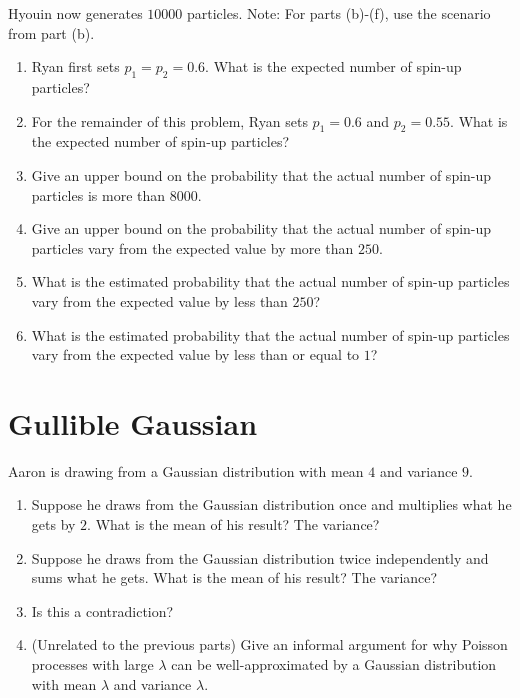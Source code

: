 \documentclass{article}
\begin{document}
Hyouin now generates $10000$ particles. Note: For parts (b)-(f), use the scenario from part (b).

\begin{enumerate}[label=(\alph*)]
\itemsep0em
    \item Ryan first sets $p_1 = p_2 = 0.6$. What is the expected number of spin-up particles?\vfill
    \item For the remainder of this problem, Ryan sets $p_1 = 0.6$ and $p_2 = 0.55$. What is the expected number of spin-up particles?\vfill
    \item Give an upper bound on the probability that the actual number of spin-up particles is more than $8000$.\vfill
    \item Give an upper bound on the probability that the actual number of spin-up particles vary from the expected value by more than $250$.\vfill
    \item What is the estimated probability that the actual number of spin-up particles vary from the expected value by less than $250$?\vfill
    \item What is the estimated probability that the actual number of spin-up particles vary from the expected value by less than or equal to $1$?\vfill
\end{enumerate}

\newpage

\section{Gullible Gaussian}

Aaron is drawing from a Gaussian distribution with mean $4$ and variance $9$.

\begin{enumerate}[label=(\alph*)]
    \item Suppose he draws from the Gaussian distribution once and multiplies what he gets by $2$. What is the mean of his result? The variance?
    \vfill

    \item Suppose he draws from the Gaussian distribution twice independently and sums what he gets. What is the mean of his result? The variance?

    \vfill

    \item Is this a contradiction?

    \vfill

    \item (Unrelated to the previous parts) Give an informal argument for why Poisson processes with large $\lambda$ can be well-approximated by a Gaussian distribution with mean $\lambda$ and variance $\lambda$.

    \vfill
\end{enumerate}
\end{document}

